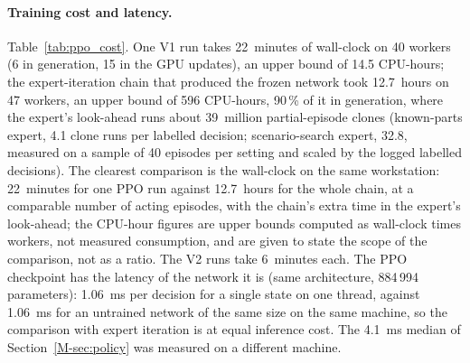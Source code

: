 \documentclass[11pt,a4paper]{article}
\theoremstyle{plain}
\theoremstyle{definition}
\theoremstyle{remark}
\newcommand{\nj}{\textsc{nj}}
\begin{document}
\paragraph{Training cost and latency.}
Table~\ref{tab:ppo_cost}. One V1 run takes 22~minutes of wall-clock on 40 workers (6
in generation, 15 in the GPU updates), an upper bound of 14.5 CPU-hours; the
expert-iteration chain that produced the frozen network took 12.7~hours on 47 workers,
an upper bound of 596 CPU-hours, 90\,\% of it in generation, where the expert's
look-ahead runs about 39~million partial-episode clones (known-parts expert, 4.1 clone
runs per labelled decision; scenario-search expert, 32.8, measured on a sample of 40
episodes per setting and scaled by the logged labelled decisions). The clearest
comparison is the wall-clock on the same workstation: 22~minutes for one PPO run against
12.7~hours for the whole chain, at a comparable number of acting episodes, with the
chain's extra time in the expert's look-ahead; the CPU-hour figures are upper bounds
computed as wall-clock times workers, not measured consumption, and are given to state
the scope of the comparison, not as a ratio. The V2 runs take 6~minutes each. The PPO checkpoint has the latency of the network it is (same
architecture, 884\,994 parameters): 1.06~ms per decision for a single state on one
thread, against 1.06~ms for an untrained network of the same size on the same machine,
so the comparison with expert iteration is at equal inference cost. The 4.1~ms median of Section~\ref{M-sec:policy} was measured on a different machine.

\begin{table}[t]
\centering
\caption{Training cost of the PPO baseline and of the expert-iteration chain
(\texttt{rl2\_gen\_s\_big} to \texttt{rl2\_gen\_s\_b}) on the same workstation. CPU-h is the
upper bound wall-clock $\times$ workers; the GPU column is the time in the policy
updates; the look-ahead clone runs of the chain are estimated from the logged labelled
decisions and a measured sample (partial episodes, not full ones). Best score = greedy
validation score vs \nj\ [\%].}
\label{tab:ppo_cost}
\resizebox{\linewidth}{!}{}
\end{table}
\end{document}
